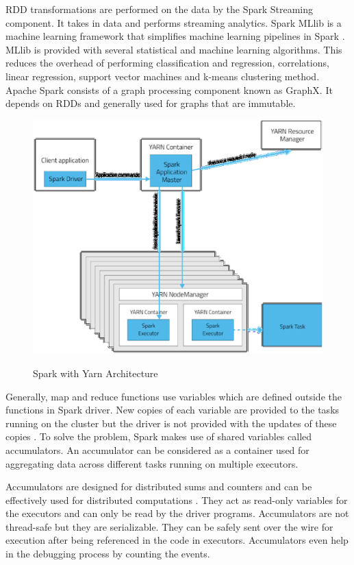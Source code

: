 \documentclass[9pt,twocolumn,twoside]{../../styles/osajnl}
\begin{document}
RDD transformations are performed on the data by the Spark Streaming
component. It takes in data and performs streaming analytics. Spark
MLlib is a machine learning framework that simplifies machine learning
pipelines in Spark \cite{sparkWiki}. MLlib is provided with several
statistical and machine learning algorithms. This reduces the overhead
of performing classification and regression, correlations, linear
regression, support vector machines and k-means clustering
method. Apache Spark consists of a graph processing component known as
GraphX. It depends on RDDs and generally used for graphs that are
immutable.

\begin{figure}[ht]
  \includegraphics[scale=0.35]{images/sparkYarn.eps}
  \caption{Spark with Yarn Architecture} \cite{sparkwithYarn}
\end{figure}

Generally, map and reduce functions use variables which are defined
outside the functions in Spark driver. New copies of each variable are
provided to the tasks running on the cluster but the driver is not
provided with the updates of these copies \cite{accumulatorSpark}. To
solve the problem, Spark makes use of shared variables called
accumulators. An accumulator can be considered as a container used for
aggregating data across different tasks running on multiple executors.

Accumulators are designed for distributed sums and counters and can be
effectively used for distributed computations
\cite{accumulatorGit}. They act as read-only variables for the
executors and can only be read by the driver programs. Accumulators
are not thread-safe but they are serializable. They can be safely sent
over the wire for execution after being referenced in the code in
executors. Accumulators even help in the debugging process by counting
the events.
\end{document}
